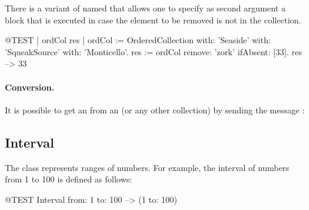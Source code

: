 \documentclass[a4paper,10pt,twoside]{book}
\begin{document}
There is a variant of  named  that allows one to specify as second argument a block that is executed in case the element to be removed is not in the collection.

\begin{code}{@TEST | ordCol res | ordCol := OrderedCollection with: 'Seaside' with: 'SqueakSource' with: 'Monticello'.}
res := ordCol remove: 'zork' ifAbsent: [33].
res --> 33
\end{code}

\paragraph{Conversion.}
It is possible to get an  from an  (or any other collection) by sending the message :






\subsection{Interval}
The class  represents ranges of numbers.
For example, the interval of numbers from 1 to 100 is defined as follows:
\begin{code}{@TEST}
Interval from: 1 to: 100 --> (1 to: 100)
\end{code}
\end{document}
